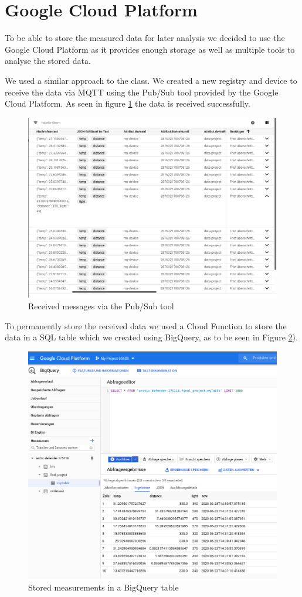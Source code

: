 \documentclass{article}
\begin{document}
\section{Google Cloud Platform}
To be able to store the measured data for later analysis we decided to use the Google Cloud Platform as it provides enough storage as well as multiple tools to analyse the stored data.\par
We used a similar approach to the class. We created a new registry and device to receive the data via MQTT using the Pub/Sub tool provided by the Google Cloud Platform. As seen in figure \ref{pic:messages} the data is received successfully.\par
\begin{figure}
\centering
\includegraphics[scale=0.4]{messages.png}
\caption{Received messages via the Pub/Sub tool}
\label{pic:messages}
\end{figure}
To permanently store the received data we used a Cloud Function to store the data in a SQL table which we created using BigQuery, as to be seen in Figure \ref{fig:table}).
\begin{figure}
\centering
\includegraphics[scale=0.4]{table.png}
\caption{Stored measurements in a BigQuery table}
\label{fig:table}
\end{figure}
\end{document}
